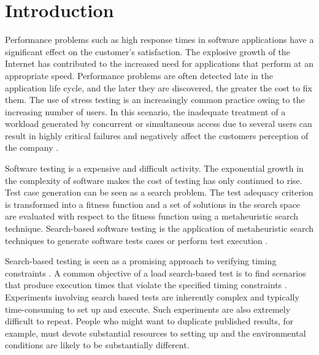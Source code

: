 \documentclass[times]{stvrauth}
\begin{document}

\maketitle


\vspace{-6pt}

\section{Introduction}

Performance problems such as high response times in software applications have a significant effect on the customer’s satisfaction. The explosive growth of the Internet has contributed to the increased need for applications that perform at an appropriate speed. Performance problems are often detected late in the application life cycle, and the later they are discovered, the greater the cost to fix them. The use of stress testing is an increasingly common practice owing to the increasing number of users. In this scenario, the inadequate treatment of a workload generated by concurrent or simultaneous access due to several users can result in highly critical failures and negatively affect the customers perception of the company \cite{Draheim2006b} \cite{Jiang2010} \cite{Molyneaux2009} \cite{Wert2014}. 

Software testing is a expensive and difficult activity. The exponential
growth in the complexity of software makes the cost of testing has only continued to rise. Test case generation can be seen as a search problem. The test adequacy criterion is transformed into a fitness function and a set of solutions in the search
space are evaluated with respect to the fitness function using a metaheuristic search technique. Search-based software testing is the application of metaheuristic search techniques to generate software
tests cases or perform test execution \cite{Afzal2009a} \cite{Gay}.


Search-based testing is seen as a promising approach to verifying timing constraints \cite{Afzal2009a}. A common objective of a load search-based test is to find  scenarios that produce execution times that violate the specified timing constraints \cite{Sullivan}. Experiments involving search based tests are inherently complex and typically time-consuming to set up and
execute. Such experiments are also extremely difficult to
repeat. People who might want to duplicate published results, for example, must devote substantial resources to setting up and the environmental conditions are likely to be substantially different. 
\end{document}
